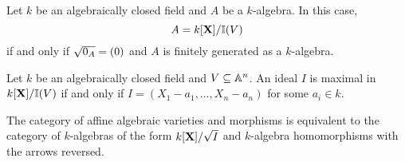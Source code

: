 \documentclass{ximera}
\begin{document}
\begin{corollary}
  Let $k$ be an algebraically closed field and $A$ be a $k$-algebra.
  In this case,
  \[
  A = k[\mathbf X]/\mathbb I(V) 
  \]
  if and only if $\sqrt{0_A} = (0)$ and $A$ is finitely generated as a
  $k$-algebra.
\end{corollary}


\begin{corollary}
  Let $k$ be an algebraically closed field and $V\subseteq\mathbb A^n$. An ideal $I$ is maximal in
  $k[\mathbf X]/\mathbb I(V)$ if and only if $I= (X_1-a_1,\dots,X_n-a_n)$ for some $a_i\in
  k$.
\end{corollary}

\begin{corollary}
  The category of affine algebraic varieties and morphisms is
  equivalent to the category of $k$-algebras of the form
  $k[\mathbf X]/\sqrt{I}$ and $k$-algebra homomorphisms with the arrows
  reversed.
\end{corollary}
\end{document}
